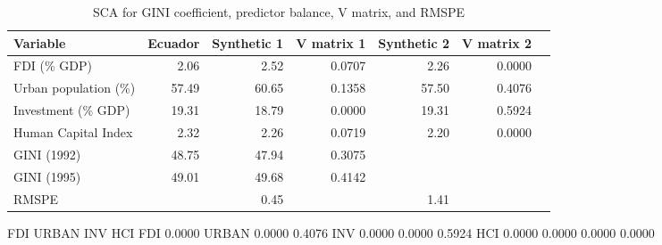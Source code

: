 \begin{table}[!h]
\begin{center}
\caption{SCA for GINI coefficient, predictor balance, V matrix, and RMSPE} \label{table:GINI_balance}
\begin{tabular}{l r r r r r r}     \\ \toprule
  Variable              &    Ecuador &  Synthetic 1 & V matrix 1 & Synthetic 2 & V matrix 2 \\
  \midrule 
  FDI (\% GDP)          &       2.06 &         2.52 &     0.0707 &        2.26 &     0.0000 \\
  Urban population (\%) &      57.49 &        60.65 &     0.1358 &       57.50 &     0.4076 \\
  Investment (\% GDP)   &      19.31 &        18.79 &     0.0000 &       19.31 &     0.5924 \\
  Human Capital Index   &       2.32 &         2.26 &     0.0719 &        2.20 &     0.0000 \\
  \midrule
  GINI (1992)           &      48.75 &        47.94 &     0.3075 &             &            \\
  GINI (1995)           &      49.01 &        49.68 &     0.4142 &             &            \\
  \midrule
  RMSPE                 &            &         0.45 &            &        1.41 &            \\
  \bottomrule 
\end{tabular}
\end{center}
\end{table}




          FDI   URBAN     INV     HCI
  FDI  0.0000
URBAN  0.0000  0.4076
  INV  0.0000  0.0000  0.5924
  HCI  0.0000  0.0000  0.0000  0.0000

